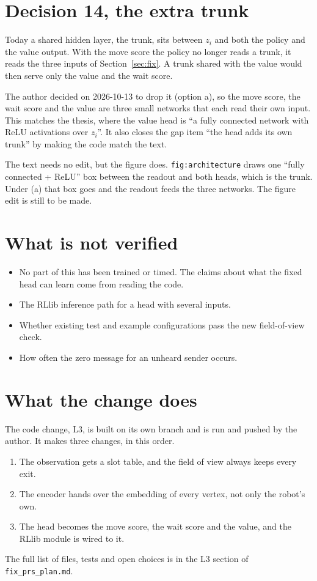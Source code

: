 \documentclass[11pt,a4paper]{article}
\begin{document}
\section{Decision 14, the extra trunk}

Today a shared hidden layer, the trunk, sits between $z_i$ and both the
policy and the value output. With the move score the policy no longer reads
a trunk, it reads the three inputs of Section~\ref{sec:fix}. A trunk shared with the
value would then serve only the value and the wait score.

The author decided on 2026-10-13 to drop it (option a), so the move score,
the wait score and the value are three small networks that each read their
own input. This matches the thesis, where the value head is ``a fully
connected network with ReLU activations over $z_i$''. It also closes the gap
item ``the head adds its own trunk'' by making the code match the text.

The text needs no edit, but the figure does. \texttt{fig:architecture} draws
one ``fully connected + ReLU'' box between the readout and both heads, which
is the trunk. Under (a) that box goes and the readout feeds the three
networks. The figure edit is still to be made.

\section{What is not verified}

\begin{itemize}[leftmargin=1.4em, itemsep=2pt]
  \item No part of this has been trained or timed. The claims about what the
    fixed head can learn come from reading the code.
  \item The RLlib inference path for a head with several inputs.
  \item Whether existing test and example configurations pass the new
    field-of-view check.
  \item How often the zero message for an unheard sender occurs.
\end{itemize}

\section{What the change does}

The code change, L3, is built on its own branch and is run and pushed by the
author. It makes three changes, in this order.

\begin{enumerate}[leftmargin=1.6em, itemsep=2pt]
  \item The observation gets a slot table, and the field of view always keeps
    every exit.
  \item The encoder hands over the embedding of every vertex, not only the
    robot's own.
  \item The head becomes the move score, the wait score and the value, and the
    RLlib module is wired to it.
\end{enumerate}

The full list of files, tests and open choices is in the L3 section of
\texttt{fix\_prs\_plan.md}.
\end{document}
